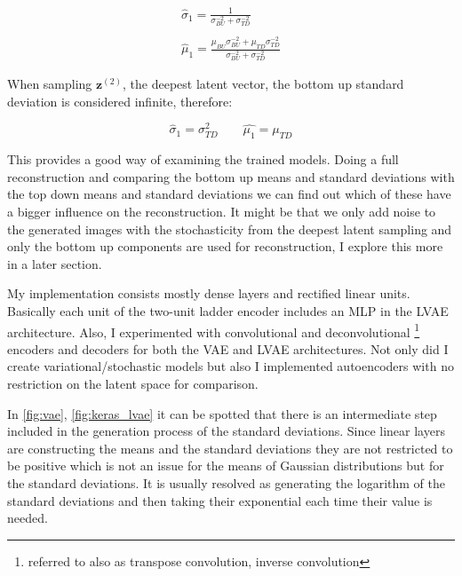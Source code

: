 \documentclass[11pt, english]{article}
\begin{document}
\vspace{3mm}

\begin{gather*}
    \hat{\sigma}_{1} = \frac{1}{\sigma_{BU}^{-2} + \sigma_{TD}^{-2}} \\ \\
    \hat{\mu}_{1} = \frac{\mu_{BU}\sigma_{BU}^{-2} + \mu_{TD}\sigma_{TD}^{-2}}{\sigma_{BU}^{-2} + \sigma_{TD}^{-2}}
\end{gather*}

\vspace{3mm}

\par When sampling $\bm{z}^{(2)}$, the deepest latent vector, the bottom up standard deviation is considered infinite, therefore:

\vspace{3mm}

\begin{equation*}
    \hat{\sigma}_{1} = \sigma_{TD}^{2} \quad \quad \hat{\mu_{1}} = \mu_{TD}
\end{equation*}

\vspace{3mm}

\par This provides a good way of examining the trained models. Doing a full reconstruction and comparing the bottom up means and standard deviations with the top down means and standard deviations we can find out which of these have a bigger influence on the reconstruction. It might be that we only add noise to the generated images with the stochasticity from the deepest latent sampling and only the bottom up components are used for reconstruction, I explore this more in a later section.

\vspace{3mm}

\par My implementation consists mostly dense layers and rectified linear units. Basically each unit of the two-unit ladder encoder includes an MLP in the LVAE architecture. Also, I experimented with convolutional and deconvolutional \footnote{referred to also as transpose convolution, inverse convolution} encoders and decoders for both the VAE and LVAE architectures. Not only did I create variational/stochastic models but also I implemented autoencoders with no restriction on the latent space for comparison.

\vspace{3mm}

\par In \ref{fig:vae}, \ref{fig:keras_lvae} it can be spotted that there is an intermediate step included in the generation process of the standard deviations. Since linear layers are constructing the means and the standard deviations they are not restricted to be positive which is not an issue for the means of Gaussian distributions but for the standard deviations. It is usually resolved as generating the logarithm of the standard deviations and then taking their exponential each time their value is needed.
\end{document}
